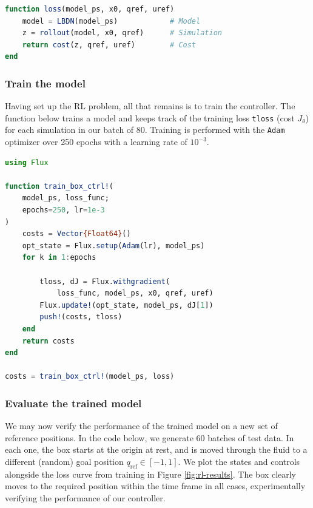 \begin{lstlisting}[language = Julia]
function loss(model_ps, x0, qref, uref)
    model = LBDN(model_ps)            # Model
    z = rollout(model, x0, qref)      # Simulation
    return cost(z, qref, uref)        # Cost
end
\end{lstlisting}

    

\subsubsection{Train the model} \label{sec:rl-train}

Having set up the RL problem, all that remains is to train the controller. The function below trains a model and keeps track of the training loss \verb|tloss| (cost $J_\theta$) for each simulation in our batch of 80. Training is performed with the \verb|Adam| optimizer over 250 epochs with a learning rate of $10^{-3}$.

\begin{lstlisting}[language = Julia]
using Flux

function train_box_ctrl!(
    model_ps, loss_func; 
    epochs=250, lr=1e-3
)
    costs = Vector{Float64}()
    opt_state = Flux.setup(Adam(lr), model_ps)
    for k in 1:epochs

        tloss, dJ = Flux.withgradient(
            loss_func, model_ps, x0, qref, uref)
        Flux.update!(opt_state, model_ps, dJ[1])
        push!(costs, tloss)
    end
    return costs
end

costs = train_box_ctrl!(model_ps, loss)
\end{lstlisting}

\subsubsection{Evaluate the trained model} \label{sec:rl-evaluate}

We may now verify the performance of the trained model on a new set of reference positions. In the code below, we generate 60 batches of test data. In each one, the box starts at the origin at rest, and is moved through the fluid to a different (random) goal position $q_\mathrm{ref} \in [-1,1].$ We plot the states and controls alongside the loss curve from training in Figure \ref{fig:rl-results}. The box clearly moves to the required position within the time frame in all cases, experimentally verifying the performance of our controller.

